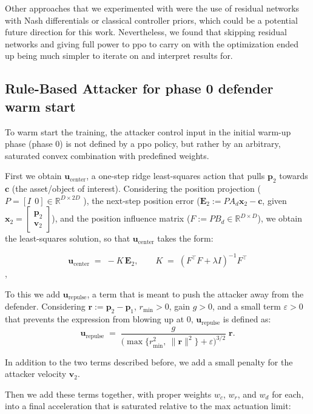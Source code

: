 Other approaches that we experimented with were the use of residual networks with Nash differentials or classical controller priors, which could be a potential future direction for this work. Nevertheless, we found that skipping residual networks and giving full power to \acs{ppo} to carry on with the optimization ended up being much simpler to iterate on and interpret results for.

\subsection{Rule-Based Attacker for phase 0 defender warm start}
\label{subsec:rule-based-attacker-warm-start}
To warm start the training, the attacker control input in the initial warm-up phase (phase 0) is not defined by a \acs{ppo} policy, but rather by an arbitrary, saturated convex combination with predefined weights.

First we obtain $\mathbf{u}_{\text{center}}$, a one-step ridge least-squares action that pulls \(\mathbf{p}_2\) towards \(\mathbf{c}\) (the asset/object of interest). Considering the position projection (\(P=[I\ \ 0]\in\mathbb{R}^{D\times 2D}\) ), the next-step position error (\(\mathbf{E}_2:= P A_d \mathbf{x}_2 - \mathbf{c}\), given \(\mathbf{x}_2=\begin{bmatrix}\mathbf{p}_2\\ \mathbf{v}_2\end{bmatrix}\)), and the position influence matrix (\(F := P B_d \in\mathbb{R}^{D\times D}\)), we obtain the least-squares solution, so that $\mathbf{u}_{\text{center}}$ takes the form:

\[
\mathbf{u}_{\text{center}} \;=\; - K\,\mathbf{E}_2,\qquad
K \;=\; (F^\top F + \lambda I)^{-1} F^\top
\],

To this we add \(\mathbf{u}_{\text{repulse}}\), a term that is meant to push the attacker away from the defender. Considering \(\mathbf{r} := \mathbf{p}_2-\mathbf{p}_1\), \(r_{\min}>0\), gain \(g>0\), and a small term \(\varepsilon > 0\) that prevents the expression from blowing up at 0, \(\mathbf{u}_{\text{repulse}}\) is defined as:
\[
\mathbf{u}_{\text{repulse}} \;=\; \frac{g}{\big(\max\{r_{\min}^2,\ \|\mathbf{r}\|^2\}+\varepsilon\big)^{3/2}}\; \mathbf{r}.
\]

In addition to the two terms described before, we add a small penalty for the attacker velocity \(\mathbf{v}_2\).


Then we add these terms together, with proper weights $w_c$, $w_r$, and $w_d$ for each, into a final acceleration that is saturated relative to the max actuation limit:


